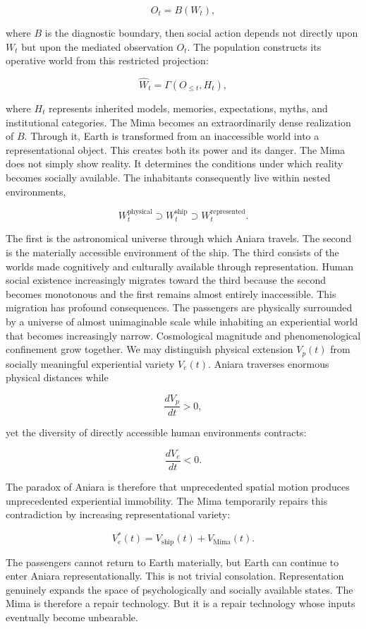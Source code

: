 \documentclass[11pt,oneside]{book}
\theoremstyle{definition}
\theoremstyle{remark}
\begin{document}
\[
O_t=B(W_t),
\]

where \(B\) is the diagnostic boundary, then social action depends not directly upon \(W_t\) but
upon the mediated observation \(O_t\). The population constructs its operative world from this
restricted projection:

\[
\widehat{W}_t = \Gamma(O_{\leq t},H_t),
\]

where \(H_t\) represents inherited models, memories, expectations, myths, and institutional
categories. The Mima becomes an extraordinarily dense realization of \(B\). Through it, Earth is
transformed from an inaccessible world into a representational object. This creates both its power
and its danger. The Mima does not simply show reality. It determines the conditions under which
reality becomes socially available. The inhabitants consequently live within nested environments,

\[
W_t^{\mathrm{physical}} \supset W_t^{\mathrm{ship}} \supset W_t^{\mathrm{represented}}.
\]

The first is the astronomical universe through which Aniara travels. The second is the materially
accessible environment of the ship. The third consists of the worlds made cognitively and culturally
available through representation. Human social existence increasingly migrates toward the third
because the second becomes monotonous and the first remains almost entirely inaccessible. This
migration has profound consequences. The passengers are physically surrounded by a universe of
almost unimaginable scale while inhabiting an experiential world that becomes increasingly narrow.
Cosmological magnitude and phenomenological confinement grow together. We may distinguish physical
extension \(V_p(t)\) from socially meaningful experiential variety \(V_e(t)\). Aniara traverses
enormous physical distances while

\[
\frac{dV_p}{dt}>0,
\]

yet the diversity of directly accessible human environments contracts:

\[
\frac{dV_e}{dt}<0.
\]

The paradox of Aniara is therefore that unprecedented spatial motion produces unprecedented
experiential immobility. The Mima temporarily repairs this contradiction by increasing
representational variety:

\[
V_e^{*}(t) = V_{\mathrm{ship}}(t) + V_{\mathrm{Mima}}(t).
\]

The passengers cannot return to Earth materially, but Earth can continue to enter Aniara
representationally. This is not trivial consolation. Representation genuinely expands the space of
psychologically and socially available states. The Mima is therefore a repair technology. But it is
a repair technology whose inputs eventually become unbearable.
\end{document}
